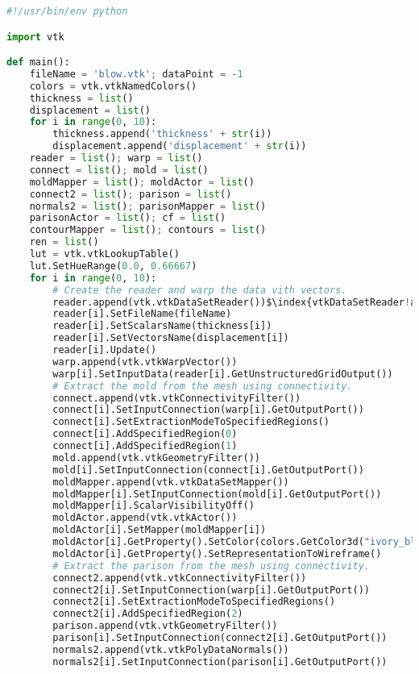 \begin{lstlisting}[language=Python, caption={Script to generate the blow molding image.}, escapechar=\$]
#!/usr/bin/env python

import vtk

def main():
    fileName = 'blow.vtk'; dataPoint = -1
    colors = vtk.vtkNamedColors()
    thickness = list()
    displacement = list()
    for i in range(0, 10):
        thickness.append('thickness' + str(i))
        displacement.append('displacement' + str(i))
    reader = list(); warp = list()
    connect = list(); mold = list()
    moldMapper = list(); moldActor = list()
    connect2 = list(); parison = list()
    normals2 = list(); parisonMapper = list()
    parisonActor = list(); cf = list()
    contourMapper = list(); contours = list()
    ren = list()
    lut = vtk.vtkLookupTable()
    lut.SetHueRange(0.0, 0.66667)
    for i in range(0, 10):
        # Create the reader and warp the data vith vectors.
        reader.append(vtk.vtkDataSetReader())$\index{vtkDataSetReader!application}$
        reader[i].SetFileName(fileName)
        reader[i].SetScalarsName(thickness[i])
        reader[i].SetVectorsName(displacement[i])
        reader[i].Update()
        warp.append(vtk.vtkWarpVector())
        warp[i].SetInputData(reader[i].GetUnstructuredGridOutput())
        # Extract the mold from the mesh using connectivity.
        connect.append(vtk.vtkConnectivityFilter())
        connect[i].SetInputConnection(warp[i].GetOutputPort())
        connect[i].SetExtractionModeToSpecifiedRegions()
        connect[i].AddSpecifiedRegion(0)
        connect[i].AddSpecifiedRegion(1)
        mold.append(vtk.vtkGeometryFilter())
        mold[i].SetInputConnection(connect[i].GetOutputPort())
        moldMapper.append(vtk.vtkDataSetMapper())
        moldMapper[i].SetInputConnection(mold[i].GetOutputPort())
        moldMapper[i].ScalarVisibilityOff()
        moldActor.append(vtk.vtkActor())
        moldActor[i].SetMapper(moldMapper[i])
        moldActor[i].GetProperty().SetColor(colors.GetColor3d("ivory_black"))
        moldActor[i].GetProperty().SetRepresentationToWireframe()
        # Extract the parison from the mesh using connectivity.
        connect2.append(vtk.vtkConnectivityFilter())
        connect2[i].SetInputConnection(warp[i].GetOutputPort())
        connect2[i].SetExtractionModeToSpecifiedRegions()
        connect2[i].AddSpecifiedRegion(2)
        parison.append(vtk.vtkGeometryFilter())
        parison[i].SetInputConnection(connect2[i].GetOutputPort())
        normals2.append(vtk.vtkPolyDataNormals())
        normals2[i].SetInputConnection(parison[i].GetOutputPort())

\end{lstlisting}
